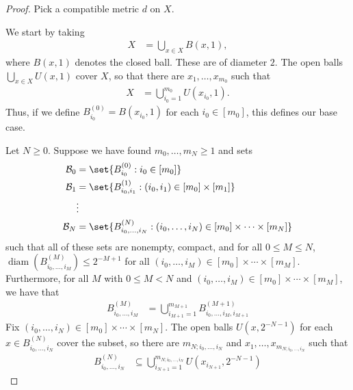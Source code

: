 \documentclass[10pt]{mypackage}
\begin{document}
\begin{proof}
  Pick a compatible metric $d$ on $X$.

  We start by taking
  \begin{align*}
    X &= \bigcup_{x\in X} B\left( x,1 \right),
  \end{align*}
  where $B\left( x,1 \right)$ denotes the closed ball. These are of diameter $2$. The open balls $\bigcup_{x\in X}U\left( x,1 \right)$ cover $X$, so that there are $x_1,\dots,x_{m_0}$  such that
  \begin{align*}
    X &= \bigcup_{i_0=1}^{m_0} U\left( x_{i_0},1 \right).
  \end{align*}
  Thus, if we define $B^{(0)}_{i_0} = B\left( x_{i_0},1 \right)$ for each $i_0\in \left[ m_0 \right]$, this defines our base case.

  Let $N\geq 0$. Suppose we have found $m_0,\dots,m_N\geq 1$ and sets 
  \begin{align*}
    \mathcal{B}_0 &= \set{B^{(0)}_{i_0} : i_0\in \left[ m_0 \right]}\\
    \mathcal{B}_1 &= \set{B^{(1)}_{i_0,i_1} : \left( i_0,i_1 \right)\in \left[ m_0 \right]\times \left[ m_1 \right]}\\
                  &\vdots\\
    \mathcal{B}_N &= \set{B^{(N)}_{i_0,\dots,i_N} : \left( i_0,\dots,i_N \right)\in \left[ m_0 \right]\times\cdots\times \left[ m_N \right]}
  \end{align*}
  such that all of these sets are nonempty, compact, and for all $0\leq M \leq N$, $ \operatorname{diam}\left( B^{(M)}_{i_0,\dots,i_M} \right) \leq 2^{-M + 1} $ for all $\left( i_0,\dots,i_M \right)\in \left[ m_0 \right]\times\cdots\times \left[ m_M \right]$. Furthermore, for all $M$ with $0\leq M < N$ and $\left( i_0,\dots,i_M \right)\in \left[ m_0 \right]\times\cdots\times \left[ m_M \right]$, we have that 
  \begin{align*}
    B^{(M)}_{i_0,\dots,i_M} &= \bigcup_{i_{M+1}=1}^{m_{M+1}} B^{(M+1)}_{i_0,\dots,i_M,i_{M+1}}\label{eq:compatibility_condition}\tag{$\ast$}
  \end{align*}
  Fix $\left( i_0,\dots,i_N \right)\in \left[ m_0 \right]\times\cdots\times \left[ m_N \right]$. The open balls $U\left( x,2^{-N-1} \right)$ for each $x\in B_{i_0,\dots,i_N}^{(N)}$ cover the subset, so there are $m_{N;i_0,\dots,i_N}$ and $x_{1},\dots,x_{m_{N;i_0,\dots,i_N}}$ such that
  \begin{align*}
    B_{i_0,\dots,i_N}^{(N)} &\subseteq \bigcup_{i_{N+1}=1}^{m_{N;i_0,\dots,i_N}} U\left( x_{i_{N+1}},2^{-N-1} \right)

\end{align*}
\end{proof}
\end{document}
